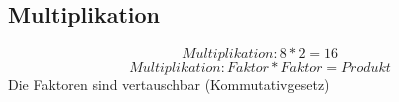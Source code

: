 \subsection{Multiplikation}

$$Multiplikation: 8*2=16$$
$$Multiplikation: Faktor*Faktor=Produkt$$
Die Faktoren sind vertauschbar (Kommutativgesetz)